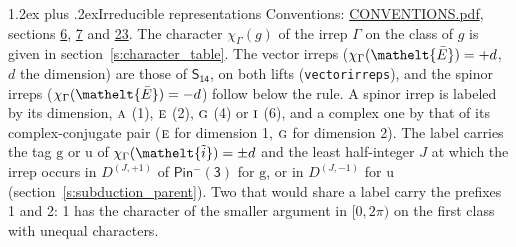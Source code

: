 \documentclass[10pt,a4paper]{article}
\makeatletter
\renewcommand\section{\@startsection{section}{1}{\z@}{-3ex plus -1ex minus -.2ex}%
  {1.2ex plus .2ex}{\normalfont\large\sffamily\bfseries\color{parttitle}}}
\numberwithin{equation}{section}
\newcommand{\eltfont}[1]{{\let\sigma\eltsigma\mathelt{#1}}}
\newcommand{\grp}[1]{\mathsf{#1}}
\newcommand{\irr}[1]{\text{\normalfont\scshape #1}}
\newcommand{\elt}[1]{\eltfont{#1}}
\newcommand{\ptag}[1]{\mathrm{#1}}
\newcommand{\irrJp}[2]{D^{(#1,#2)}}
\newcommand{\irchar}[1]{\chi_{#1}}
\newcommand{\barred}[1]{\bar{#1}}
\newcommand{\lift}[1]{\tilde{#1}}
\makeatother
\begin{document}
\section{Irreducible representations}\label{s:irreps}
Conventions: \href{../../CONVENTIONS.pdf}{CONVENTIONS.pdf}, sections \href{../../../rotation/CONVENTIONS.pdf\#conv.6}{6}, \href{../../../rotation/CONVENTIONS.pdf\#conv.7}{7} and \href{../../CONVENTIONS.pdf\#conv.23}{23}.
\leavevmode\label{n:function.character}\label{n:irrep.Gamma}The character $\irchar{\Gamma}(g)$ of the irrep $\Gamma$ on the class of $g$ is given in section~\ref{s:character_table}. \label{n:index.dimension}The vector irreps ($\irchar{\Gamma}(\elt{\barred{E}}) = +d$, $d$ the dimension) are those of \href{../../../rotation/data/pdf/S14.pdf}{$\grp{S_{14}}$}, on both lifts (\texttt{vectorirreps}), and the spinor irreps ($\irchar{\Gamma}(\elt{\barred{E}}) = -d$) follow below the rule. A spinor irrep is labeled by its dimension, $\irr{a}$ (1), $\irr{e}$ (2), $\irr{g}$ (4) or $\irr{i}$ (6), and a complex one by that of its complex-conjugate pair ($\irr{e}$ for dimension 1, $\irr{g}$ for dimension 2). The label carries the tag $\ptag{g}$ or $\ptag{u}$ of $\irchar{\Gamma}(\elt{\lift{i}}) = \pm d$ and the least half-integer $J$ at which the irrep occurs in $\irrJp{J}{+1}$ of $\grp{Pin^{-}(3)}$ for $\ptag{g}$, or in $\irrJp{J}{-1}$ for $\ptag{u}$ (section~\ref{s:subduction_parent}). Two that would share a label carry the prefixes 1 and 2: 1 has the character of the smaller argument in $[0, 2\pi)$ on the first class with unequal characters.
\end{document}
